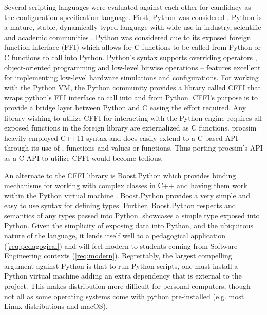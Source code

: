 Several scripting languages were evaluated against each other for candidacy as the configuration specification language. First, Python was considered \cite{Python:Homepage}. Python is a mature, stable, dynamically typed language with wide use in industry, scientific and academic communities \cite{StackOverflowSurvey2016}. Python was considered due to its exposed foreign function interface (FFI) which allows for C functions to be called from Python or C functions to call into Python. Python's syntax supports overriding operators \cite{Python:Operators}, object-oriented programming \cite{Python:Classes} and low-level bitwise operations \cite{Python:BuiltinTypes} -- features excellent for implementing low-level hardware simulations and configurations. For working with the Python VM, the Python community provides a library called CFFI that wraps python's FFI interface to call into and from Python. CFFI's purpose is to provide a bridge layer between Python and C easing the effort required. Any library wishing to utilize CFFI for interacting with the Python engine requires all exposed functions in the foreign library are externalized as C functions. procsim heavily employed C++11 syntax and does easily extend to a C-based API through its use of ,  functions and  values or functions. Thus porting procsim's API as a C API to utilize CFFI would become tedious. 

An alternate to the CFFI library is Boost.Python which provides binding mechanisms for working with complex classes in C++ and having them work within the Python virtual machine \cite{Boost1.53.0:Python}. Boost.Python provides a very simple and easy to use syntax for defining types. Further, Boost.Python respects  and  semantics of any types passed into Python.  showcases a simple type exposed into Python. Given the simplicity of exposing data into Python, and the ubiquitous nature of the language, it lends itself well to a pedagogical application (\cref{req:pedagogical}) and will feel modern to students coming from Software Engineering contexts (\cref{req:modern}). Regrettably, the largest compelling argument against Python is that to run Python scripts, one must install a Python virtual machine adding an extra dependency that is external to the project. This makes distribution more difficult for personal computers, though not all as some operating systems come with python pre-installed (e.g. most Linux distributions and macOS).

